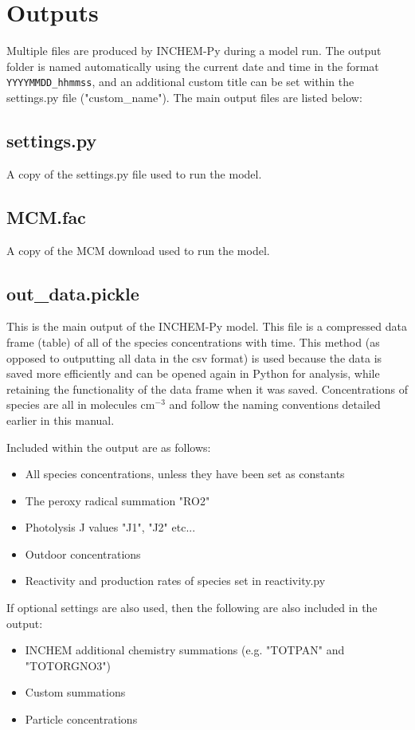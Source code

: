 \documentclass[a4paper]{refart}
\begin{document}
\newpage
\section{Outputs}\label{outputs}
Multiple files are produced by INCHEM-Py during a model run. The output folder is named automatically using the current date and time in the format \texttt{YYYYMMDD\_hhmmss}, and an additional custom title can be set within the settings.py file ("custom\_name"). The main output files are listed below: 

\subsection{settings.py}
A copy of the settings.py file used to run the model.

\subsection{MCM.fac}
A copy of the MCM download used to run the model.

\subsection{out\_data.pickle}
This is the main output of the INCHEM-Py model. This file is a compressed data frame (table) of all of the species concentrations with time. This method (as opposed to outputting all data in the csv format) is used because the data is saved more efficiently and can be opened again in Python for analysis, while retaining the functionality of the data frame when it was saved. Concentrations of species are all in molecules cm$^{-3}$ and follow the naming conventions detailed earlier in this manual.

Included within the output are as follows:
\begin{itemize}
    \item All species concentrations, unless they have been set as constants
    \item The peroxy radical summation "RO2"
    \item Photolysis J values "J1", "J2" etc...
    \item Outdoor concentrations
    \item Reactivity and production rates of species set in  reactivity.py 
\end{itemize}
If optional settings are also used, then the following are also included in the output:
\begin{itemize}
    \item INCHEM additional chemistry summations (e.g. "TOTPAN" and "TOTORGNO3")
    \item Custom summations
    \item Particle concentrations
\end{itemize}
\end{document}
